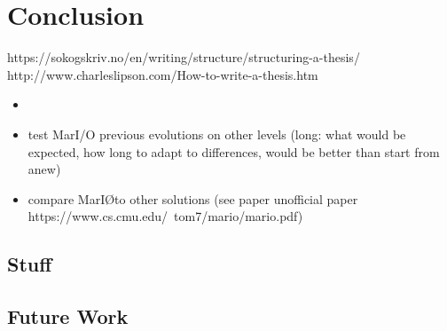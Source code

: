 %
\chapter{Conclusion}
\label{sec:conclusion}



https://sokogskriv.no/en/writing/structure/structuring-a-thesis/
http://www.charleslipson.com/How-to-write-a-thesis.htm

\begin{itemize}
	\item 
	\item test MarI/O previous evolutions on other levels (long: what would be expected, how long to adapt to differences, would be better than start from anew)
	\item compare MarI\O to other solutions (see paper unofficial paper https://www.cs.cmu.edu/~tom7/mario/mario.pdf)
\end{itemize}


\section{Stuff}
\label{sec:conclusion:sec1}


\section{Future Work}
\label{sec:conclusion:future}

